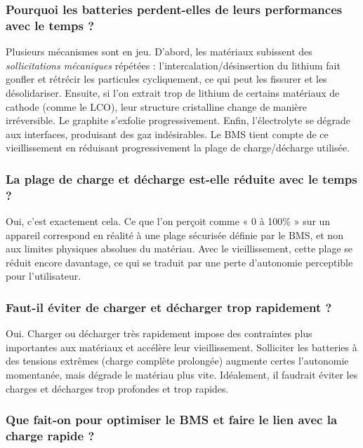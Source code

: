 \subsubsection{Pourquoi les batteries perdent-elles de leurs performances avec le temps ?}

Plusieurs mécanismes sont en jeu. D'abord, les matériaux subissent des \textit{sollicitations mécaniques} répétées : l'intercalation/désinsertion du lithium fait gonfler et rétrécir les particules cycliquement, ce qui peut les fissurer et les désolidariser. Ensuite, si l'on extrait trop de lithium de certains matériaux de cathode (comme le LCO), leur structure cristalline change de manière irréversible. Le graphite s'exfolie progressivement. Enfin, l'électrolyte se dégrade aux interfaces, produisant des gaz indésirables. Le BMS tient compte de ce vieillissement en réduisant progressivement la plage de charge/décharge utilisée.

\subsubsection{La plage de charge et décharge est-elle réduite avec le temps ?}

Oui, c'est exactement cela. Ce que l'on perçoit comme « 0 à 100\% » sur un appareil correspond en réalité à une plage sécurisée définie par le BMS, et non aux limites physiques absolues du matériau. Avec le vieillissement, cette plage se réduit encore davantage, ce qui se traduit par une perte d'autonomie perceptible pour l'utilisateur.

\subsubsection{Faut-il éviter de charger et décharger trop rapidement ?}

Oui. Charger ou décharger très rapidement impose des contraintes plus importantes aux matériaux et accélère leur vieillissement. Solliciter les batteries à des tensions extrêmes (charge complète prolongée) augmente certes l'autonomie momentanée, mais dégrade le matériau plus vite. Idéalement, il faudrait éviter les charges et décharges trop profondes et trop rapides.

\subsubsection{Que fait-on pour optimiser le BMS et faire le lien avec la charge rapide ?}

